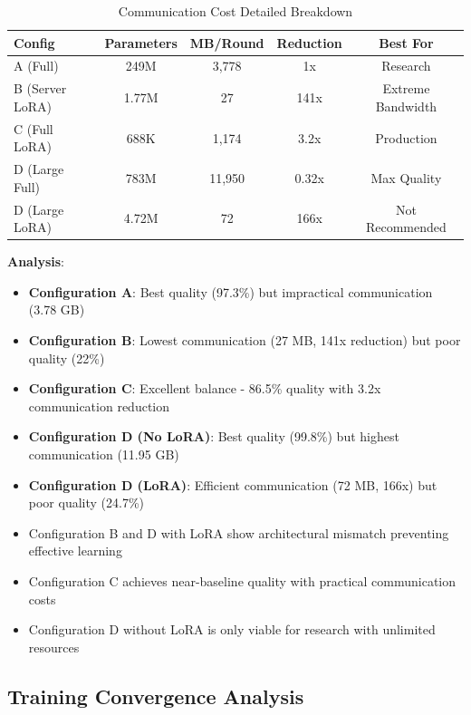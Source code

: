 \documentclass[conference]{IEEEtran}
\begin{document}
\begin{table}[h]
\centering
\caption{Communication Cost Detailed Breakdown}
\label{tab:communication}
\begin{tabular}{@{}lcccc@{}}
\toprule
\textbf{Config} & \textbf{Parameters} & \textbf{MB/Round} & \textbf{Reduction} & \textbf{Best For} \\
\midrule
A (Full) & 249M & 3,778 & 1x & Research \\
B (Server LoRA) & 1.77M & 27 & 141x & Extreme Bandwidth \\
C (Full LoRA) & 688K & 1,174 & 3.2x & Production \\
D (Large Full) & 783M & 11,950 & 0.32x & Max Quality \\
D (Large LoRA) & 4.72M & 72 & 166x & Not Recommended \\
\bottomrule
\end{tabular}
\end{table}

\textbf{Analysis}:
\begin{itemize}
    \item \textbf{Configuration A}: Best quality (97.3\%) but impractical communication (3.78 GB)
    \item \textbf{Configuration B}: Lowest communication (27 MB, 141x reduction) but poor quality (22\%)
    \item \textbf{Configuration C}: Excellent balance - 86.5\% quality with 3.2x communication reduction
    \item \textbf{Configuration D (No LoRA)}: Best quality (99.8\%) but highest communication (11.95 GB)
    \item \textbf{Configuration D (LoRA)}: Efficient communication (72 MB, 166x) but poor quality (24.7\%)
    \item Configuration B and D with LoRA show architectural mismatch preventing effective learning
    \item Configuration C achieves near-baseline quality with practical communication costs
    \item Configuration D without LoRA is only viable for research with unlimited resources
\end{itemize}

\subsection{Training Convergence Analysis}
\end{document}
